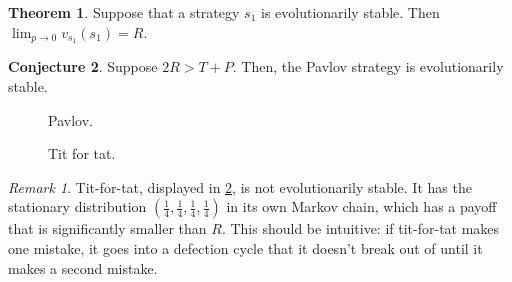 \documentclass[11pt]{amsart}
\theoremstyle{definition}
\newtheorem{theorem}{Theorem}[section]
\newtheorem{conjecture}[theorem]{Conjecture}
\theoremstyle{remark}
\newtheorem*{remark}{Remark}
\begin{document}
\begin{theorem}
  \label{evolutionarystable1}
  Suppose that a strategy $s_1$ is evolutionarily stable. Then $\lim_{p \to 0} v_{s_1}(s_1) = R$.
\end{theorem}

\begin{conjecture}
  \label{pavlovtheorem}
  Suppose $2R > T + P$. Then, the Pavlov strategy is evolutionarily stable.
\end{conjecture}

\begin{figure}
  \label{pavlovfigure}
  \centering
  \caption{Pavlov.}
\end{figure}

\begin{figure}
  \label{tftfigure}
  \centering
  \caption{Tit for tat.}
\end{figure}


\begin{remark}
  Tit-for-tat, displayed in \cref{tftfigure}, is not evolutionarily stable. It has the stationary distribution $(\frac{1}{4},\frac{1}{4},\frac{1}{4},\frac{1}{4})$ in its own Markov chain, which has a payoff that is significantly smaller than $R$. This should be intuitive: if tit-for-tat makes one mistake, it goes into a defection cycle that it doesn't break out of until it makes a second mistake.

\end{remark}
\end{document}
